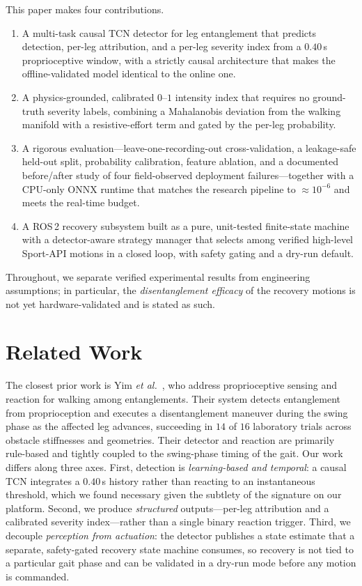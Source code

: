 \documentclass[conference]{IEEEtran}
\begin{document}
This paper makes four contributions.
\begin{enumerate}
\item A multi-task causal TCN detector for leg entanglement that predicts
detection, per-leg attribution, and a per-leg severity index from a $0.40$\,s
proprioceptive window, with a strictly causal architecture that makes the
offline-validated model identical to the online one.
\item A physics-grounded, calibrated $0$--$1$ intensity index that requires no
ground-truth severity labels, combining a Mahalanobis deviation from the walking
manifold with a resistive-effort term and gated by the per-leg probability.
\item A rigorous evaluation---leave-one-recording-out cross-validation, a
leakage-safe held-out split, probability calibration, feature ablation, and a
documented before/after study of four field-observed deployment failures---together
with a CPU-only ONNX runtime that matches the research pipeline to $\approx\!10^{-6}$
and meets the real-time budget.
\item A ROS\,2 recovery subsystem built as a pure, unit-tested finite-state
machine with a detector-aware strategy manager that selects among verified
high-level Sport-API motions in a closed loop, with safety gating and a dry-run
default.
\end{enumerate}
Throughout, we separate verified experimental results from engineering assumptions;
in particular, the \emph{disentanglement efficacy} of the recovery motions is not
yet hardware-validated and is stated as such.

\section{Related Work}
The closest prior work is Yim \emph{et al.}~\cite{yim2023entanglement}, who address
proprioceptive sensing and reaction for walking among entanglements. Their system
detects entanglement from proprioception and executes a disentanglement maneuver
during the swing phase as the affected leg advances, succeeding in $14$ of $16$
laboratory trials across obstacle stiffnesses and geometries. Their detector and
reaction are primarily rule-based and tightly coupled to the swing-phase timing of
the gait. Our work differs along three axes. First, detection is
\emph{learning-based and temporal}: a causal TCN integrates a $0.40$\,s history
rather than reacting to an instantaneous threshold, which we found necessary given
the subtlety of the signature on our platform. Second, we produce
\emph{structured} outputs---per-leg attribution and a calibrated severity
index---rather than a single binary reaction trigger. Third, we decouple
\emph{perception from actuation}: the detector publishes a state estimate that a
separate, safety-gated recovery state machine consumes, so recovery is not tied to
a particular gait phase and can be validated in a dry-run mode before any motion is
commanded.
\end{document}
